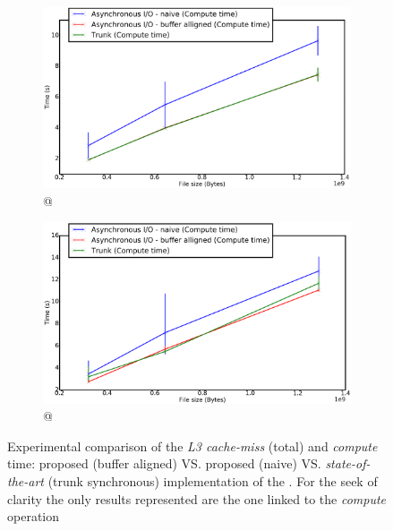 \begin{figure}[!h]
\begin{subfigure}[b]{0.475\textwidth}
					\includegraphics[width=\textwidth]{charts/cubeRemapper_falseSharing_compute_time_workstation_8core.png}
					\caption[]%
					{{\small \targetPlatformLaptop @ \targetPlatformLaptopFrequency}}
					\label{fig:cubeRemapper_falseSharing_compute_time_workstation_8core}
				\end{subfigure}
				\hfill
				\begin{subfigure}[b]{0.475\textwidth}  
					\centering 
					\includegraphics[width=\textwidth]{charts/cubeRemapper_falseSharing_compute_time_hpc.png}
					\caption[]%
					{{\small \targetPlatformHpc \space @ \targetPlatformHpcFrequency}}
					\label{fig:cubeRemapper_falseSharing_compute_time_hpc}
				\end{subfigure}
				\caption{Experimental comparison of the \emph{L3 cache-miss} (total) and \emph{compute} time: proposed \emph{\notationaio}\space (buffer aligned) VS. proposed \emph{\notationaio}\space (naive) VS. \emph{state-of-the-art} (trunk synchronous) implementation of the \toolTargetSoftware.   For the seek of clarity the only results represented are the one linked to the \emph{compute} operation}
				\label{fig:cubeRemapper_falseSharing_compute}
			\end{figure}

